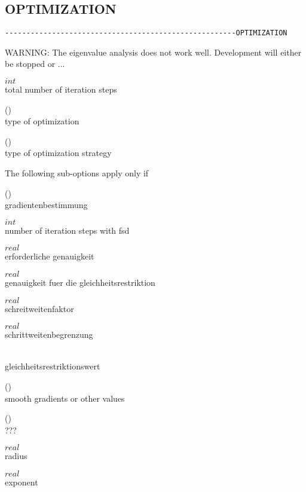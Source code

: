 \subsection{OPTIMIZATION}
\begin{verbatim}
------------------------------------------------------OPTIMIZATION
\end{verbatim}

WARNING: The eigenvalue analysis does not work well. Development will either
be stopped or ...

 $int$\\
total number of iteration steps

 (\kor{})\\
type of optimization

 (\kor{})\\
type of optimization strategy

The following sub-options apply only if 

 (\kor{})\\
gradientenbestimmung

 $int$\\
number of iteration steps with fsd

 $real$\\
erforderliche genauigkeit                  

 $real$\\
genauigkeit fuer die gleichheitsrestriktion

 $real$\\
schreitweitenfaktor                        

 $real$\\
schrittweitenbegrenzung                    

\\
gleichheitsrestriktionswert                

  (\kor{})\\
smooth gradients or other values

 (\kor{})\\
???

 $real$\\
radius

 $real$\\
exponent


